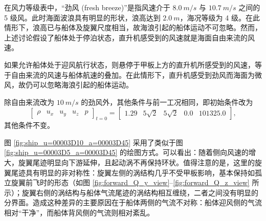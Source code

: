 在风力等级表中，“劲风 (fresh breeze)”是指风速介于 $\SI{8.0}{m/s}$ 与 $\SI{10.7}{m/s}$
之间的 5 级风。此时海面波浪具有明显的形状，浪高达到 $\SI{2.0}{m}$，海况等级为 4 级。在此情形下，浪高已与船体及旋翼尺度相当，故海浪引起的船体运动不可忽略。然而，上述讨论假设了船体处于停泊状态，直升机感受到的风速就是海面自由来流的风速。

如果允许船体处于迎风航行状态，则悬停于甲板上方的直升机所感受到的风速，等于自由来流的风速与船体航速的叠加。在此情形下，直升机感受到劲风而海面为微风，故仍可以忽略海浪引起的船体运动。
\begin{problem}
[直升机侧面迎劲风悬停于甲板中部上方]\label{prob:=0076F4=005347=00673A=004FA7=009762=008FCE=0052B2=0098CE=0060AC=00505C=004E8E=007532=00677F=004E2D=0090E8=004E0A=0065B9}除自由来流改为
$\SI{10}{m/s}$ 的劲风外，其他条件与前一工况相同，即初始条件改为
\begin{equation}
\begin{bmatrix}\rho & u_{x} & u_{y} & u_{z} & p\end{bmatrix}_{t=0}=\begin{bmatrix}1.29 & 5\sqrt{2} & 5\sqrt{2} & 0.0 & 101325.0\end{bmatrix},
\end{equation}
其他条件不变。
\end{problem}

图 \ref{fig:ship_u=00003D10_a=00003D45} 采用了类似于图 \ref{fig:ship_u=00003D5_a=00003D45}
的绘图方式。可以看出：随着侧向风速的增大，旋翼尾迹明显向下游延伸，且起动涡不再保持环状。值得注意的是，这里的旋翼尾迹具有明显的非对称性：旋翼左侧的涡结构几乎不受甲板影响，基本保持如孤立旋翼前飞时的形态（如图
\ref{fig:forward_Q_y_view}–\ref{fig:forward_Q_z_view} 所示）；旋翼右侧的涡结构与船体气流尾迹的涡结构相互缠绕，二者之间没有明显的分界面。造成这种差异的主要原因在于船体两侧的气流不对称：船体迎风侧的气流相对“干净”，而船体背风侧的气流则相对紊乱。

